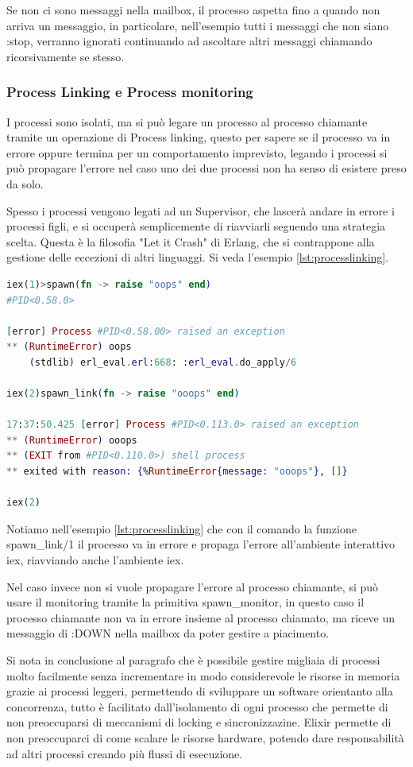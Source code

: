 Se non ci sono messaggi nella mailbox, il processo aspetta fino a
quando non arriva un messaggio, in particolare, 
nell'esempio tutti i messaggi che
non siano :stop, verranno ignorati continuando ad ascoltare altri
messaggi chiamando ricorsivamente se stesso.

\subsubsection{Process Linking e Process monitoring}

I processi sono isolati, ma si può legare un processo
al processo chiamante tramite un operazione di Process linking,
questo per sapere se il processo va in errore
oppure termina per un comportamento imprevisto,
legando i processi si può propagare l'errore nel caso
uno dei due processi non ha senso di esistere preso da solo.

Spesso i processi vengono legati ad un Supervisor, che
lascerà andare in errore i processi figli, e si occuperà
semplicemente di riavviarli seguendo una strategia scelta.
Questa è la filosofia "Let it Crash"
di Erlang, che si contrappone alla gestione delle eccezioni
di altri linguaggi. Si veda l'esempio \ref{lst:processlinking}.

\newpage

\begin{lstlisting}[language=elixir, caption={Process linking},captionpos=b,
	label={lst:processlinking}]
iex(1)>spawn(fn -> raise "oops" end)
#PID<0.58.0>
	
[error] Process #PID<0.58.00> raised an exception
** (RuntimeError) oops
	(stdlib) erl_eval.erl:668: :erl_eval.do_apply/6

iex(2)spawn_link(fn -> raise "ooops" end)

17:37:50.425 [error] Process #PID<0.113.0> raised an exception
** (RuntimeError) ooops
** (EXIT from #PID<0.110.0>) shell process 
** exited with reason: {%RuntimeError{message: "ooops"}, []}

iex(2)
\end{lstlisting}

Notiamo nell'esempio \ref{lst:processlinking} che con il comando
la funzione spawn\_link/1 il processo va in errore e propaga
l'errore all'ambiente interattivo iex, riavviando anche
l'ambiente iex.

Nel caso invece non si vuole propagare l'errore al processo
chiamante, si può usare il monitoring tramite la primitiva
spawn\_monitor, in questo caso il processo chiamante
non va in errore insieme al processo chiamato, ma riceve
un messaggio di :DOWN nella mailbox da poter gestire a piacimento.

Si nota in conclusione al paragrafo che è possibile
gestire migliaia di processi molto facilmente senza
incrementare in modo considerevole le risorse in memoria grazie
ai processi leggeri, permettendo
di sviluppare un software orientanto alla concorrenza,
tutto è facilitato dall'isolamento di ogni processo che 
permette di non preoccuparsi di meccanismi di locking e sincronizzazine.
Elixir permette di non preoccuparci di come scalare
le risorse hardware, potendo dare responsabilità ad altri
processi creando più flussi di esecuzione.
